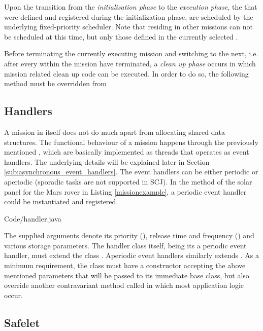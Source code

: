 Upon the transition from the \textit{initialisation phase} to the \textit{execution phase}, the  that were defined and registered during the initialization phase, are scheduled by the underlying fixed-priority scheduler. Note that  residing in other missions can not be scheduled at this time, but only those defined in the currently selected . 

Before terminating the currently executing mission and switching to the next, i.e. after every  within the mission have terminated, a \textit{clean up phase} occurs in which mission related clean up code can be executed. In order to do so, the following method must be overridden from 

\begin{quotation}
\end{quotation}

\subsection{Handlers}
\label{subsection:handlers}
A mission in itself does not do much apart from allocating shared data structures. The functional behaviour of a mission happens through the previously mentioned , which are basically implemented as threads that operates as event handlers. The underlying details will be explained later in Section \ref{sub:asynchronous_event_handlers}. The event handlers can be either periodic or aperiodic (sporadic tasks are not supported in SCJ). In the  method of the solar panel  for the Mars rover in Listing \ref{missionexample}, a periodic event handler could be instantiated and registered.


{Code/handler.java}

The supplied arguments denote its priority (), release time and frequency () and various storage parameters. The handler class itself, being its a periodic event handler, must extend the class . Aperiodic event handlers similarly extends . As a minimum requirement, the class must have a constructor accepting the above mentioned parameters that will be passed to its immediate base class, but also override another contravariant method called  in which most application logic occur.

\subsection{Safelet}
\label{subsection:safelet}